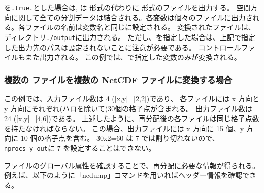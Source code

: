 
を\verb|.true.|とした場合は, \sno は \scalenetcdf 形式の代わりに \grads 形式のファイルを出力する。
空間方向に関して全ての分割データは結合される。各変数は個々のファイルに出力される。各ファイルの名前は変数名と同じに設定される。
変換されたファイルは、ディレクトリ\verb|./output|に出力される。
ただし、を指定した場合は、上記で指定した出力先のパスは設定されないことに注意が必要である。
コントロールファイルもまた出力される。
この例では、で指定した変数のみが変換される。

\subsubsection{複数の \scalenetcdf ファイルを複数の NetCDF ファイルに変換する場合}


この例では、入力ファイル数は 4 ([x,y]=[2,2])であり、
各ファイルには x 方向と y 方向にそれぞれ(ハロを除いて)30個の格子点が含まれる。
出力ファイル数は 24 ([x,y]=[4,6])である。
上述したように、再分配後の各ファイルは同じ格子点数を持たなければならない。
この場合、出力ファイルには x 方向に 15 個、y 方向に 10 個の格子点を含む。
30x2=60 は 7 では割り切れないので、 \verb|nprocs_y_out|に 7 を設定することはできない。

\scalenetcdf ファイルのグローバル属性を確認することで、再分配に必要な情報が得られる。
例えば、以下のように「ncdump」コマンドを用いればヘッダー情報を確認できる。

